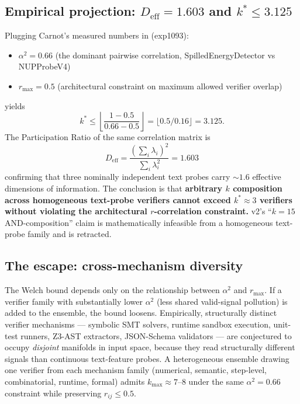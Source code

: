 \documentclass[10pt]{article}
\begin{document}
\subsection{Empirical projection: $D_{\mathrm{eff}} = 1.603$ and
$k^* \leq 3.125$}

Plugging Carnot's measured numbers in (exp1093):
\begin{itemize}
  \item $\alpha^2 = 0.66$ (the dominant pairwise correlation,
        SpilledEnergyDetector vs NUPProbeV4)
  \item $r_{\max} = 0.5$ (architectural constraint on maximum
        allowed verifier overlap)
\end{itemize}
yields
\begin{equation}
  k^* \leq \left\lfloor \frac{1 - 0.5}{0.66 - 0.5} \right\rfloor
        = \lfloor 0.5 / 0.16 \rfloor = 3.125.
\end{equation}
The Participation Ratio of the same correlation matrix is
\begin{equation}
  D_{\mathrm{eff}} = \frac{(\sum_i \lambda_i)^2}{\sum_i \lambda_i^2}
                    = 1.603
\end{equation}
confirming that three nominally independent text probes carry
$\sim 1.6$ effective dimensions of information. The conclusion is
that \textbf{arbitrary $k$ composition across homogeneous text-probe
verifiers cannot exceed $k^* \approx 3$ verifiers without violating
the architectural $r$-correlation constraint.} v2's ``$k = 15$
AND-composition'' claim is mathematically infeasible from a
homogeneous text-probe family and is retracted.

\subsection{The escape: cross-mechanism diversity}
\label{sec:escape}

The Welch bound depends only on the relationship between $\alpha^2$
and $r_{\max}$. If a verifier family with substantially lower
$\alpha^2$ (less shared valid-signal pollution) is added to the
ensemble, the bound loosens. Empirically, structurally distinct
verifier mechanisms --- symbolic SMT solvers, runtime sandbox
execution, unit-test runners, Z3-AST extractors, JSON-Schema
validators --- are conjectured to occupy \emph{disjoint} manifolds
in input space, because they read structurally different signals
than continuous text-feature probes. A heterogeneous ensemble
drawing one verifier from each mechanism family (numerical,
semantic, step-level, combinatorial, runtime, formal) admits
$k_{\max} \approx 7\text{--}8$ under the same $\alpha^2 = 0.66$
constraint while preserving $r_{ij} \leq 0.5$.
\end{document}
